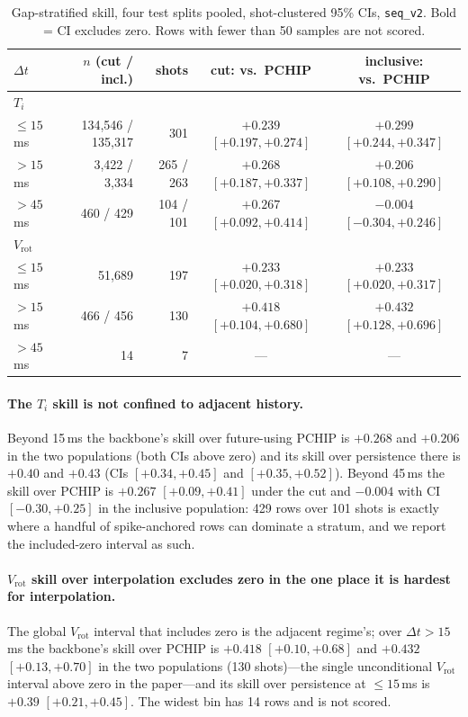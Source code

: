\documentclass[10pt]{article}
\newcommand{\Ti}{\ensuremath{T_i}}
\newcommand{\Vrot}{\ensuremath{V_\mathrm{rot}}}
\newcommand{\seqv}{\texttt{seq\_v2}}
\begin{document}
\begin{table}[t]
  \centering
  \caption{Gap-stratified skill, four test splits pooled, shot-clustered 95\% CIs,
  \seqv{}. Bold = CI excludes zero. Rows with fewer than 50 samples are not scored.}
  \label{tab:gap}
  \small
  \begin{tabular}{lrrcc}
    \toprule
    $\Delta t$ & $n$ (cut / incl.) & shots & cut: vs.\ PCHIP & inclusive: vs.\ PCHIP \\
    \midrule
    \multicolumn{5}{l}{\emph{\Ti{}}}\\
    $\leq 15$\,ms & 134{,}546 / 135{,}317 & 301 & $\mathbf{+0.239}$ $[+0.197, +0.274]$ & $\mathbf{+0.299}$ $[+0.244, +0.347]$ \\
    $> 15$\,ms    &   3{,}422 /   3{,}334 & 265 / 263 & $\mathbf{+0.268}$ $[+0.187, +0.337]$ & $\mathbf{+0.206}$ $[+0.108, +0.290]$ \\
    $> 45$\,ms    &      460 /      429 & 104 / 101 & $\mathbf{+0.267}$ $[+0.092, +0.414]$ & $-0.004$ $[-0.304, +0.246]$ \\
    \midrule
    \multicolumn{5}{l}{\emph{\Vrot{}}}\\
    $\leq 15$\,ms & 51{,}689 & 197 & $\mathbf{+0.233}$ $[+0.020, +0.318]$ & $\mathbf{+0.233}$ $[+0.020, +0.317]$ \\
    $> 15$\,ms    &      466 / 456 & 130 & $\mathbf{+0.418}$ $[+0.104, +0.680]$ & $\mathbf{+0.432}$ $[+0.128, +0.696]$ \\
    $> 45$\,ms    &       14 & 7 & --- & --- \\
    \bottomrule
  \end{tabular}
\end{table}

\paragraph{The \Ti{} skill is not confined to adjacent history.} Beyond 15\,ms the
backbone's skill over future-using PCHIP is $+0.268$ and $+0.206$ in the two
populations (both CIs above zero) and its skill over persistence there is $+0.40$
and $+0.43$ (CIs $[+0.34, +0.45]$ and $[+0.35, +0.52]$). Beyond 45\,ms the skill
over PCHIP is $+0.267$ $[+0.09, +0.41]$ under the cut and $-0.004$ with CI
$[-0.30, +0.25]$ in the inclusive population: 429 rows over 101 shots is exactly
where a handful of spike-anchored rows can dominate a stratum, and we report the
included-zero interval as such.

\paragraph{\Vrot{} skill over interpolation excludes zero in the one place it is
hardest for interpolation.} The global \Vrot{} interval that includes zero is the
adjacent regime's; over $\Delta t > 15$\,ms the backbone's skill over PCHIP is
$+0.418$ $[+0.10, +0.68]$ and $+0.432$ $[+0.13, +0.70]$ in the two populations (130
shots)---the single unconditional \Vrot{} interval above zero in the paper---and
its skill over persistence at $\leq 15$\,ms is $+0.39$ $[+0.21, +0.45]$. The widest
bin has 14 rows and is not scored.
\end{document}
